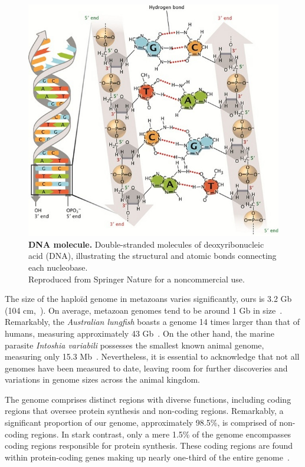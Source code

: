 \begin{figure}[ht]
    \centering
    \includegraphics[width=0.8\linewidth]{figures/dna_molecule.jpg}
    \caption[DNA molecule]{\textbf{DNA molecule.} Double-stranded molecules of deoxyribonucleic acid (DNA), illustrating the structural and atomic bonds connecting each nucleobase. \\
    \scriptsize{Reproduced from Springer Nature for a noncommercial use.}}
    \label{fig:dnamolecule}
\end{figure}

The size of the haploïd genome in metazoans varies significantly, ours is 3.2 \acrshort{Gb} (104 cm,~\citet{piovesan_length_2019}). On average, metazoan genomes tend to be around 1 \acrshort{Gb} in size~\citep{hotaling_toward_2021}. Remarkably, the \textit{Australian lungfish} boasts a genome 14 times larger than that of humans, measuring approximately 43 \acrshort{Gb}~\citep{meyer_giant_2021}. On the other hand, the marine parasite \textit{Intoshia variabili} possesses the smallest known animal genome, measuring only 15.3 \acrshort{Mb}~\citep{slyusarev_extreme_2020}. Nevertheless, it is essential to acknowledge that not all genomes have been measured to date, leaving room for further discoveries and variations in genome sizes across the animal kingdom.

The genome comprises distinct regions with diverse functions, including coding regions that oversee protein synthesis and non-coding regions. Remarkably, a significant proportion of our genome, approximately 98.5\%, is comprised of non-coding regions. In stark contrast, only a mere 1.5\% of the genome encompasses coding regions responsible for protein synthesis. These coding regions are found within protein-coding genes making up nearly one-third of the entire genome~\citep{lander_initial_2001, venter_sequence_2001, international_human_genome_sequencing_consortium_finishing_2004}.



